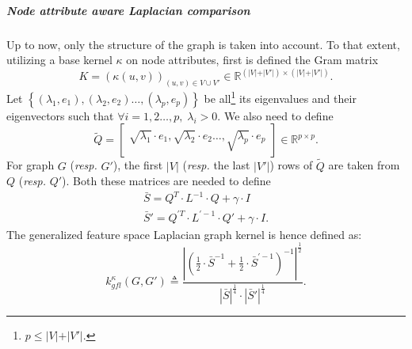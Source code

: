                 \subparagraph{Node attribute aware Laplacian comparison}
                    Up to now, only the structure of the graph is taken into account.
                    To that extent, utilizing a base kernel $\kappa$ on node attributes, first is defined the Gram matrix
                    \begin{equation*}
                        K=\left(\kappa\left(u, v\right)\right)_{(u,v) \in V \cup V'} \in \mathbb{R}^{\left(\vert V \vert + \vert V' \vert\right) \times \left(\vert V \vert + \vert V' \vert\right)}.
                    \end{equation*}
                    Let $\left\{ (\lambda_1, e_1), (\lambda_2, e_2)\dots,(\lambda_p, e_p) \right\}$ be all\footnote{$p \leq \vert V \vert + \vert V' \vert$.} its eigenvalues and their eigenvectors such that $\forall i = 1, 2 \dots, p,\; \lambda_i > 0$.
                    We also need to define
                    \begin{equation*}
                        \widetilde{Q} = \begin{bmatrix}
                            \sqrt{\lambda_1}\cdot e_1, \sqrt{\lambda_2}\cdot e_2 \dots, \sqrt{\lambda_p}\cdot e_p
                        \end{bmatrix} \in \mathbb{R}^{p \times p}.
                    \end{equation*}
                    For graph \(G\) (\textit{resp.} \(G'\)), the first $\vert V \vert$ (\textit{resp.} the last $\vert V' \vert$) rows of $\widetilde{Q}$ are taken from $Q$ (\textit{resp.} $Q'$).
                    Both these matrices are needed to define 
                    \begin{align*}
                        \bar{S} = Q^T\cdot L ^{-1}\cdot Q + \gamma \cdot I\\
                        \bar{S}' = Q^{\prime T}\cdot L^{\prime -1}\cdot Q' + \gamma \cdot I.
                    \end{align*}
                    The generalized feature space Laplacian graph kernel is hence defined as:
                    \begin{equation}
                        \label{eq::generalized_feature_laplacian_kernel}
                        k^{\kappa}_{gfl}(G, G') \triangleq \frac{\left\lvert \left(\frac{1}{2} \cdot \bar{S}^{-1} + \frac{1}{2} \cdot \bar{S}^{\prime -1} \right)^{-1} \right\rvert^{\frac{1}{2}}}{\left\lvert \bar{S}\right\rvert^{\frac{1}{4}}\cdot\left\lvert \bar{S}' \right\rvert^{\frac{1}{4}}}.
                    \end{equation}

